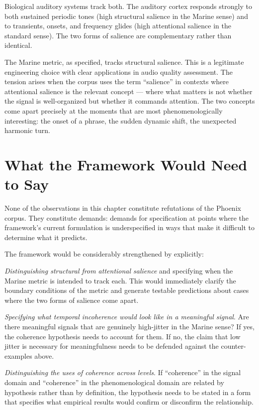 Biological auditory systems track both. The auditory cortex
responds strongly to both sustained periodic tones (high
structural salience in the Marine sense) and to transients,
onsets, and frequency glides (high attentional salience in
the standard sense). The two forms of salience are
complementary rather than identical.

The Marine metric, as specified, tracks structural salience.
This is a legitimate engineering choice with clear applications
in audio quality assessment. The tension arises when the
corpus uses the term ``salience'' in contexts where attentional
salience is the relevant concept --- where what matters is
not whether the signal is well-organized but whether it
commands attention. The two concepts come apart precisely
at the moments that are most phenomenologically interesting:
the onset of a phrase, the sudden dynamic shift, the
unexpected harmonic turn.

\section{What the Framework Would Need to Say}
\label{sec:framework-needs}

None of the observations in this chapter constitute refutations
of the Phoenix corpus. They constitute demands: demands for
specification at points where the framework's current
formulation is underspecified in ways that make it difficult
to determine what it predicts.

The framework would be considerably strengthened by explicitly:

\textit{Distinguishing structural from attentional salience}
and specifying when the Marine metric is intended to track
each. This would immediately clarify the boundary conditions
of the metric and generate testable predictions about
cases where the two forms of salience come apart.

\textit{Specifying what temporal incoherence would look like
in a meaningful signal}. Are there meaningful signals that
are genuinely high-jitter in the Marine sense? If yes,
the coherence hypothesis needs to account for them. If no,
the claim that low jitter is necessary for meaningfulness
needs to be defended against the counter-examples above.

\textit{Distinguishing the uses of coherence across levels}.
If ``coherence'' in the signal domain and ``coherence'' in
the phenomenological domain are related by hypothesis rather
than by definition, the hypothesis needs to be stated in
a form that specifies what empirical results would confirm
or disconfirm the relationship.

